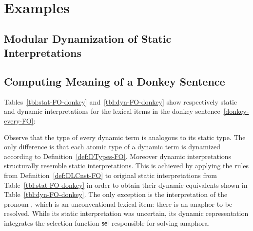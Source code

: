 \section{Examples} \label{sec:examples}

\subsection{Modular Dynamization of Static Interpretations}


\subsection{Computing Meaning of a Donkey Sentence}

Tables~\ref{tbl:stat-FO-donkey} and~\ref{tbl:dyn-FO-donkey} show respectively static and dynamic interpretations for the lexical items in the donkey sentence~\eqref{donkey-every-FO}:

Observe that the type of every dynamic term is analogous to its static type. The only difference is that each atomic type of a dynamic term is dynamized according to Definition~\ref{def:DTypes-FO}. Moreover dynamic interpretations structurally resemble static interpretations. This is achieved by applying the rules from Definition~\ref{def:DLCnst-FO} to original static interpretations from Table~\ref{tbl:stat-FO-donkey} in order to obtain their dynamic equivalents shown in Table~\ref{tbl:dyn-FO-donkey}. The only exception is the interpretation of the pronoun , which is an unconventional lexical item: there is an anaphor to be resolved. While its static interpretation was uncertain, its dynamic representation integrates the selection function $\mathsf{sel}$ responsible for solving anaphora.


